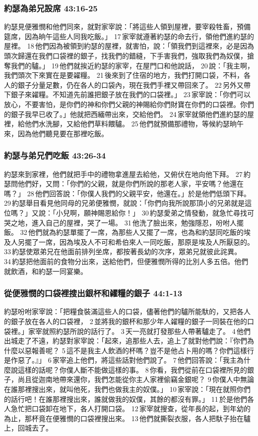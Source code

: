 \subsubsection{約瑟為弟兄設席 43:16-25}
約瑟見便雅憫和他們同來，就對家宰說：「將這些人領到屋裡，要宰殺牲畜，預備筵席，因為晌午這些人同我吃飯。」 17 家宰就遵著約瑟的命去行，領他們進約瑟的屋裡。 18 他們因為被領到約瑟的屋裡，就害怕，說：「領我們到這裡來，必是因為頭次歸還在我們口袋裡的銀子，找我們的錯縫，下手害我們，強取我們為奴僕，搶奪我們的驢。」 19 他們就挨近約瑟的家宰，在屋門口和他說話， 20 說：「我主啊，我們頭次下來實在是要糴糧。 21 後來到了住宿的地方，我們打開口袋，不料，各人的銀子分量足數，仍在各人的口袋內，現在我們手裡又帶回來了。 22 另外又帶下銀子來糴糧。不知道先前誰把銀子放在我們的口袋裡。」 23 家宰說：「你們可以放心，不要害怕，是你們的神和你們父親的神賜給你們財寶在你們的口袋裡。你們的銀子我早已收了。」他就把西緬帶出來，交給他們。 24 家宰就領他們進約瑟的屋裡，給他們水洗腳，又給他們草料餵驢。 25 他們就預備那禮物，等候約瑟晌午來，因為他們聽見要在那裡吃飯。


\subsubsection{約瑟与弟兄們吃飯 43:26-34}
約瑟來到家裡，他們就把手中的禮物拿進屋去給他，又俯伏在地向他下拜。 27 約瑟問他們好，又問：「你們的父親，就是你們所說的那老人家，平安嗎？他還在嗎？」 28 他們回答說：「你僕人我們的父親平安，他還在。」於是他們低頭下拜。 29 約瑟舉目看見他同母的兄弟便雅憫，就說：「你們向我所說那頂小的兄弟就是這位嗎？」又說：「小兒啊，願神賜恩給你！」 30 約瑟愛弟之情發動，就急忙尋找可哭之地，進入自己的屋裡，哭了一場。 31 他洗了臉出來，勉強隱忍，吩咐人擺飯。 32 他們就為約瑟單擺了一席，為那些人又擺了一席，也為和約瑟同吃飯的埃及人另擺了一席，因為埃及人不可和希伯來人一同吃飯，那原是埃及人所厭惡的。 33 約瑟使眾弟兄在他面前排列坐席，都按著長幼的次序，眾弟兄就彼此詫異。 34 約瑟把他面前的食物分出來，送給他們，但便雅憫所得的比別人多五倍。他們就飲酒，和約瑟一同宴樂。

\subsubsection{從便雅憫的口袋裡搜出銀杯和糴糧的銀子 44:1-13}
約瑟吩咐家宰說：「把糧食裝滿這些人的口袋，儘著他們的驢所能馱的，又把各人的銀子放在各人的口袋裡， 2 並將我的銀杯和那少年人糴糧的銀子一同裝在他的口袋裡。」家宰就照約瑟所說的話行了。 3 天一亮就打發那些人帶著驢走了。 4 他們出城走了不遠，約瑟對家宰說：「起來，追那些人去，追上了就對他們說：『你們為什麼以惡報善呢？ 5 這不是我主人飲酒的杯嗎？豈不是他占卜用的嗎？你們這樣行是作惡了。』」 6 家宰追上他們，將這些話對他們說了。 7 他們回答說：「我主為什麼說這樣的話呢？你僕人斷不能做這樣的事。 8 你看，我們從前在口袋裡所見的銀子，尚且從迦南地帶來還你，我們怎能從你主人家裡偷竊金銀呢？ 9 你僕人中無論在誰那裡搜出來，就叫他死，我們也做我主的奴僕。」 10 家宰說：「現在就照你們的話行吧！在誰那裡搜出來，誰就做我的奴僕，其餘的都沒有罪。」 11 於是他們各人急忙把口袋卸在地下，各人打開口袋。 12 家宰就搜查，從年長的起，到年幼的為止，那杯竟在便雅憫的口袋裡搜出來。 13 他們就撕裂衣服，各人把馱子抬在驢上，回城去了。

